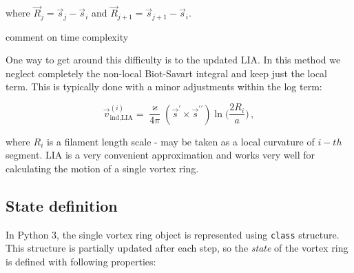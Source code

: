 where $\vec{R}_j = \vec{s}_j - \vec{s}_i$ and $\vec{R}_{j+1} = \vec{s}_{j+1} - \vec{s}_i$.

\todo comment on time complexity

One way to get around this difficulty is to the updated LIA. In this method we neglect completely the non-local Biot-Savart integral and keep just the local term. This is typically done with a minor adjustments within the log term:

\begin{equation}
\vec{v}_{\text{ind,LIA}}^{(i)} =
\frac{\varkappa}{4\pi} (\vec{s}^{\prime} \times \vec{s}^{\prime \prime})
\ln{\Big(\frac{2R_i}{a}\Big)}\,,
\end{equation}

where $R_i$ is a filament length scale - may be taken as a local curvature of $i-th$ segment. LIA is a very convenient approximation and works very well for calculating the motion of a single vortex ring.

\subsection*{State definition}

In Python 3, the single vortex ring object is represented using \texttt{class} structure. This structure is partially updated after each step, so the \textit{state} of the vortex ring is defined with following properties:

